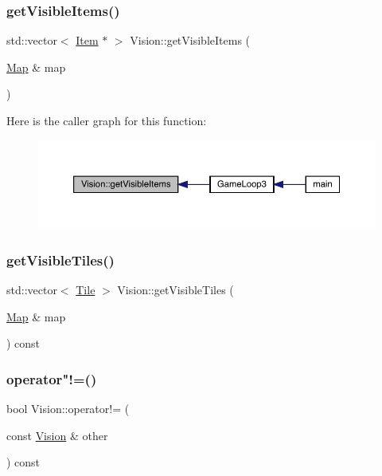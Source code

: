 \subsubsection{\texorpdfstring{get\+Visible\+Items()}{getVisibleItems()}}
{\footnotesize\ttfamily std\+::vector$<$ \mbox{\hyperlink{class_item}{Item}} $\ast$ $>$ Vision\+::get\+Visible\+Items (\begin{DoxyParamCaption}\item[{\mbox{\hyperlink{class_map}{Map}} \&}]{map }\end{DoxyParamCaption})}

Here is the caller graph for this function\+:
\nopagebreak
\begin{figure}[H]
\begin{center}
\leavevmode
\includegraphics[width=350pt]{da/d76/class_vision_a57e240a165d83bd1869e4053af0a4569_icgraph}
\end{center}
\end{figure}
\mbox{\label{class_vision_a52683d5635319444a095ad79d6745c3b}} 
\subsubsection{\texorpdfstring{get\+Visible\+Tiles()}{getVisibleTiles()}}
{\footnotesize\ttfamily std\+::vector$<$ \mbox{\hyperlink{class_tile}{Tile}} $>$ Vision\+::get\+Visible\+Tiles (\begin{DoxyParamCaption}\item[{\mbox{\hyperlink{class_map}{Map}} \&}]{map }\end{DoxyParamCaption}) const}

\mbox{\label{class_vision_ac71d59ce1d122996ae2a22dba22f2636}} 
\subsubsection{\texorpdfstring{operator"!=()}{operator!=()}}
{\footnotesize\ttfamily bool Vision\+::operator!= (\begin{DoxyParamCaption}\item[{const \mbox{\hyperlink{class_vision}{Vision}} \&}]{other }\end{DoxyParamCaption}) const}

